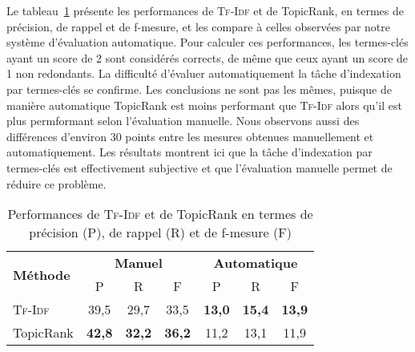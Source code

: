         Le
        tableau~\ref{tab:main-automatic_evaluation_of_keyphrase_annotation-results-topicrank-prf}
        présente les performances de \textsc{Tf-Idf} et de TopicRank, en termes
        de précision, de rappel et de f-mesure, et les compare à celles
        observées par notre système d'évaluation automatique. Pour calculer ces
        performances, les termes-clés ayant un score de 2 sont considérés
        corrects, de même que ceux ayant un score de 1 non redondants. La
        difficulté d'évaluer automatiquement la tâche d'indexation par
        termes-clés se confirme. Les conclusions ne sont pas les mêmes, puisque
        de manière automatique TopicRank est moins performant que
        \textsc{Tf-Idf} alors qu'il est plus permformant selon l'évaluation
        manuelle. Nous observons aussi des différences d'environ 30 points entre
        les mesures obtenues manuellement et automatiquement. Les résultats
        montrent ici que la tâche d'indexation par termes-clés est effectivement
        subjective et que l'évaluation manuelle permet de réduire ce problème.
        \begin{table}[h!]
          \centering
          \begin{tabular}{l|ccc|ccc}
            \toprule
            \multirow{2}{*}{\textbf{Méthode}} & \multicolumn{3}{c|}{\textbf{Manuel}} & \multicolumn{3}{c}{\textbf{Automatique}}\\
            \cline{2-7}
            & P & R & F & P & R & F\\
            \hline
            \textsc{Tf-Idf} & 39,5 & 29,7 & 33,5 & \textbf{13,0} & \textbf{15,4} & \textbf{13,9}\\
            TopicRank & \textbf{42,8} & \textbf{32,2} & \textbf{36,2} & 11,2 & 13,1 & 11,9\\
            \bottomrule
          \end{tabular}
          \caption[
            Performances de \textsc{Tf-Idf} et de TopicRank en termes de
            précision, de rappel et de f-mesure
          ]{
            Performances de \textsc{Tf-Idf} et de TopicRank en termes de
            précision (P), de rappel (R) et de f-mesure (F)
            \label{tab:main-automatic_evaluation_of_keyphrase_annotation-results-topicrank-prf}}
        \end{table}
      
